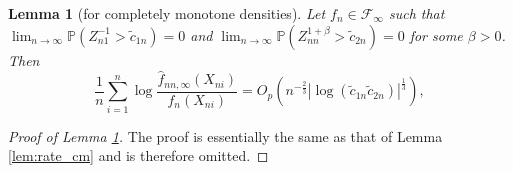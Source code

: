 \documentclass[12pt,letterpaper, twoside, openany]{article}
\theoremstyle{plain}
\newtheorem{lemma}[theorem]{Lemma}
\newtheorem{remark}[theorem]{Remark}
\begin{document}

\begin{lemma}[for completely monotone densities]\label{lemma:CM_bootstrap_rate}
Let $f_n \in \mathcal{F}_\infty$ such that $\lim_{n \rightarrow \infty}\mathbb{P}(Z_{n1}^{-1} > \tilde{c}_{1n}) = 0$ and $\lim_{n \rightarrow \infty}\mathbb{P}(Z^{1+\beta}_{nn} > \tilde{c}_{2n}) = 0$ for some $\beta  >0$. Then
\begin{equation*}
	\frac{1}{n} \sum^n_{i=1} \log \frac{ \hat{f}_{nn,\infty}(X_{ni})}{f_n(X_{ni})} = O_p\left ( n^{-\frac{2}{3}}|\log  (\tilde{c}_{1n} \tilde{c}_{2n} )|^{\frac{1}{3}}\right),
\end{equation*}
\end{lemma}

\begin{proof}[Proof of Lemma \ref{lemma:CM_bootstrap_rate}]
The proof is essentially the same as that of Lemma \ref{lem:rate_cm} and is therefore omitted.
\end{proof}
\end{document}
